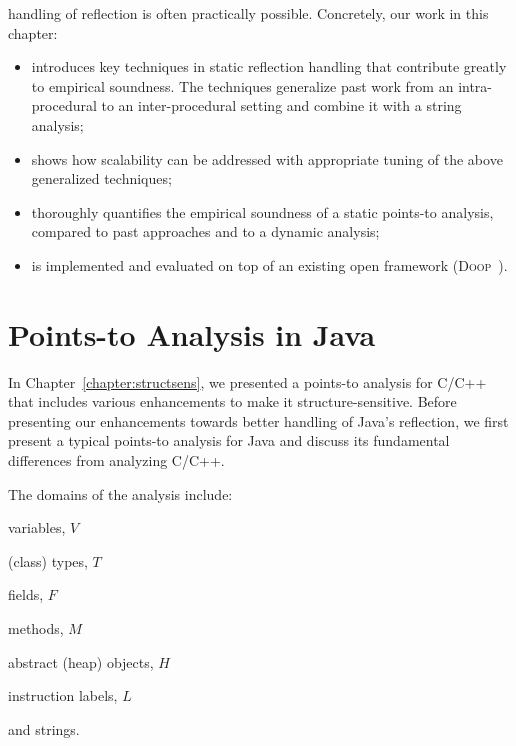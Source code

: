 handling of reflection is often practically possible. Concretely, our
work in this chapter:
\begin{itemize}[\(\cdot\)]
\item introduces key techniques in static reflection handling that
  contribute greatly to empirical soundness. The techniques generalize
  past work from an intra-procedural to an inter-procedural setting
  and combine it with a string analysis;
\item shows how scalability can be addressed with appropriate tuning
  of the above generalized techniques;
\item thoroughly quantifies the empirical soundness of a static
  points-to analysis, compared to past approaches and to a dynamic
  analysis;
\item is implemented and evaluated on top of an existing open
  framework (\textsc{Doop}~\cite{oopsla/BravenboerS09}).
\end{itemize}



\section{Points-to Analysis in Java}
\label{reflection/sec:javapt}

In Chapter~\ref{chapter:structsens}, we presented a points-to analysis
for C/C++ that includes various enhancements to make it
structure-sensitive. Before presenting our enhancements towards better
handling of Java's reflection, we first present a typical points-to
analysis for Java and discuss its fundamental differences from
analyzing C/C++.

The domains of the analysis include:
\begin{compactitem}[\(\cdot\)]
\item variables, \(V\)
\item (class) types, \(T\)
\item fields, \(F\)
\item methods, \(M\)
\item abstract (heap) objects, \(H\)
\item instruction labels, \(L\)
\item and strings.
\end{compactitem}

